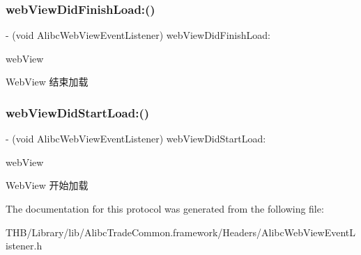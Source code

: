 \subsubsection{\texorpdfstring{web\+View\+Did\+Finish\+Load\+:()}{webViewDidFinishLoad:()}}
{\footnotesize\ttfamily -\/ (void Alibc\+Web\+View\+Event\+Listener) web\+View\+Did\+Finish\+Load\+: \begin{DoxyParamCaption}\item[{(U\+I\+Web\+View $\ast$)}]{web\+View }\end{DoxyParamCaption}\hspace{0.3cm}{\ttfamily [optional]}}

Web\+View 结束加载 \mbox{\label{protocol_alibc_web_view_event_listener_01-p_a2fc3db84e89fcfe3ad9cb2e414ac94d2}} 
\subsubsection{\texorpdfstring{web\+View\+Did\+Start\+Load\+:()}{webViewDidStartLoad:()}}
{\footnotesize\ttfamily -\/ (void Alibc\+Web\+View\+Event\+Listener) web\+View\+Did\+Start\+Load\+: \begin{DoxyParamCaption}\item[{(U\+I\+Web\+View $\ast$)}]{web\+View }\end{DoxyParamCaption}\hspace{0.3cm}{\ttfamily [optional]}}

Web\+View 开始加载 

The documentation for this protocol was generated from the following file\+:\begin{DoxyCompactItemize}
\item 
T\+H\+B/\+Library/lib/\+Alibc\+Trade\+Common.\+framework/\+Headers/Alibc\+Web\+View\+Event\+Listener.\+h\end{DoxyCompactItemize}
